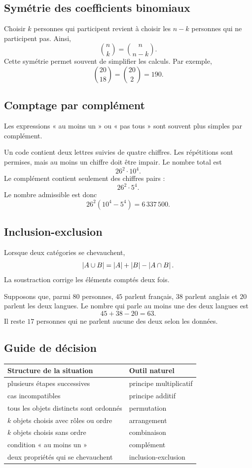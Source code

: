 \subsection{Symétrie des coefficients binomiaux}

Choisir $k$ personnes qui participent revient à choisir les $n-k$ personnes qui ne participent pas. Ainsi,
\[
\binom nk=\binom n{n-k}.
\]
Cette symétrie permet souvent de simplifier les calculs. Par exemple,
\[
\binom{20}{18}=\binom{20}{2}=190.
\]

\subsection{Comptage par complément}

Les expressions « au moins un » ou « pas tous » sont souvent plus simples par complément.

\begin{examplebox}
Un code contient deux lettres suivies de quatre chiffres. Les répétitions sont permises, mais au moins un chiffre doit être impair. Le nombre total est
\[
26^2\cdot10^4.
\]
Le complément contient seulement des chiffres pairs :
\[
26^2\cdot5^4.
\]
Le nombre admissible est donc
\[
26^2(10^4-5^4)=6\,337\,500.
\]
\end{examplebox}

\subsection{Inclusion-exclusion}

Lorsque deux catégories se chevauchent,
\[
\left\lvert A\cup B\right\rvert=\left\lvert A\right\rvert+\left\lvert B\right\rvert-\left\lvert A\cap B\right\rvert.
\]
La soustraction corrige les éléments comptés deux fois.

Supposons que, parmi $80$ personnes, $45$ parlent français, $38$ parlent anglais et $20$ parlent les deux langues. Le nombre qui parle au moins une des deux langues est
\[
45+38-20=63.
\]
Il reste $17$ personnes qui ne parlent aucune des deux selon les données.

\subsection{Guide de décision}

\begin{center}
\begin{tabularx}{\textwidth}{@{}lY@{}}
\toprule
Structure de la situation & Outil naturel\\\midrule
plusieurs étapes successives & principe multiplicatif\\
cas incompatibles & principe additif\\
tous les objets distincts sont ordonnés & permutation\\
$k$ objets choisis avec rôles ou ordre & arrangement\\
$k$ objets choisis sans ordre & combinaison\\
condition « au moins un » & complément\\
deux propriétés qui se chevauchent & inclusion-exclusion\\
\bottomrule
\end{tabularx}
\end{center}

